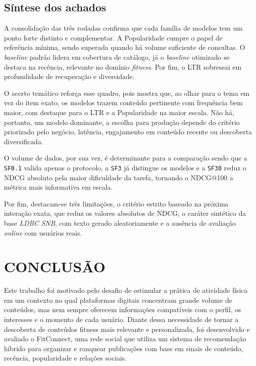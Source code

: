 \documentclass[a4paper,12pt]{article}
\begin{document}
{\subsection{Síntese dos achados}

A consolidação das três rodadas confirma que cada família de modelos tem um ponto forte distinto e complementar. A Popularidade cumpre o papel de referência mínima, sendo superada quando há volume suficiente de consultas. O \textit{baseline} padrão lidera em cobertura de catálogo, já o \textit{baseline} otimizado se destaca na recência, relevante no domínio \textit{fitness}. Por fim, o LTR sobressai em profundidade de recuperação e diversidade. 

O acerto temático reforça esse quadro, pois mostra que, ao olhar para o tema em vez do item exato, os modelos trazem conteúdo pertinente com frequência bem maior, com destaque para o LTR e a Popularidade na maior escala. Não há, portanto, um modelo dominante, a escolha para produção depende do critério priorizado pelo negócio, latência, engajamento em conteúdo recente ou descoberta diversificada.

O volume de dados, por sua vez, é determinante para a comparação sendo que a \texttt{SF0.1} valida apenas o protocolo, a \texttt{SF3} já distingue os modelos e a \texttt{SF30} reduz o NDCG absoluto pela maior dificuldade da tarefa, tornando o NDCG@100 a métrica mais informativa em escala.

Por fim, destacam-se três limitações, o critério estrito baseado na próxima interação exata, que reduz os valores absolutos de NDCG, o caráter sintético da base \textit{LDBC SNB}, com texto gerado aleatoriamente e a ausência de avaliação \textit{online} com usuários reais.


\section{CONCLUSÃO}

Este trabalho foi motivado pelo desafio de estimular a prática de atividade física em um contexto no qual plataformas digitais concentram grande volume de conteúdos, mas nem sempre oferecem informações compatíveis com o perfil, os interesses e o momento de cada usuário. Diante dessa necessidade de tornar a descoberta de conteúdos fitness mais relevante e personalizada, foi desenvolvido e avaliado o FitConnect, uma rede social que utiliza um sistema de recomendação híbrido para organizar e ranquear publicações com base em sinais de conteúdo, recência, popularidade e relações sociais.

}
\end{document}
